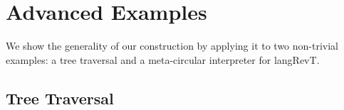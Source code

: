 \documentclass{llncs}
\begin{document}
%







\section{Advanced Examples} 

We show the generality of our construction by applying it to two non-trivial
examples: a tree traversal and a meta-circular interpreter for
{{langRevT}}.



\subsection{Tree Traversal}
\label{sec:tree}
\end{document}
